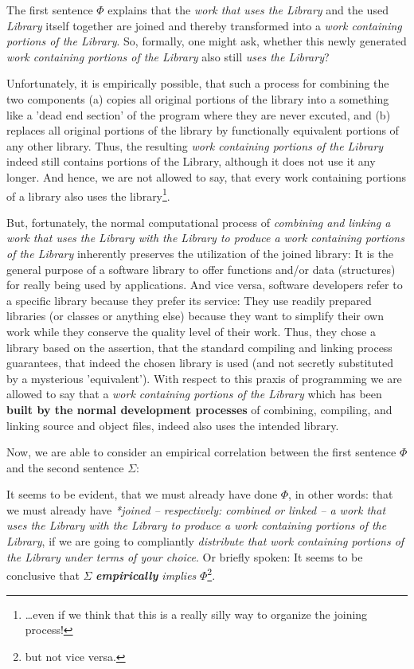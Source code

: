 The first sentence $\Phi$ explains that the \emph{work that uses the Library}
and the used \emph{Library} itself together are joined and thereby transformed
into a \emph{work containing portions of the Library}. So, formally, one might
ask, whether this newly generated \emph{work containing portions of the Library}
also still \emph{uses the Library}?

Unfortunately, it is empirically possible, that such a process for combining the
two components (a) copies all original portions of the library into a something
like a 'dead end section' of the program where they are never excuted, and (b)
replaces all original portions of the library by functionally equivalent
portions of any other library. Thus, the resulting \emph{work containing
portions of the Library} indeed still contains portions of the Library, although
it does not use it any longer. And hence, we are not allowed to say, that every
work containing portions of a library also uses the library\footnote{\ldots even
if we think that this is a really silly way to organize the joining process!}.

But, fortunately, the normal computational process of \emph{combining and
linking a work that uses the Library with the Library to produce a work
containing portions of the Library} inherently preserves the utilization of the
joined library: It is the general purpose of a software library to offer
functions and/or data (structures) for really being used by applications. And
vice versa, software developers refer to a specific library because they prefer
its service: They use readily prepared libraries (or classes or anything else)
because they want to simplify their own work while they conserve the quality
level of their work. Thus, they chose a library based on the assertion, that the
standard compiling and linking process guarantees, that indeed the chosen
library is used (and not secretly substituted by a mysterious 'equivalent').
With respect to this praxis of programming we are allowed to say that a
\emph{work containing portions of the Library} which has been \textbf{built by
the normal development processes} of combining, compiling, and linking source
and object files, indeed also uses the intended library.

Now, we are able to consider an empirical correlation between the first sentence
$\Phi$ and the second sentence $\Sigma$:

It seems to be evident, that we must already have done $\Phi$, in other words:
that we must already have \emph{*joined -- respectively: combined or linked -- a
work that uses the Library with the Library to produce a work containing
portions of the Library}, if we are going to compliantly \emph{distribute that
work containing portions of the Library under terms of your choice}. Or briefly
spoken: It seems to be conclusive that $\Sigma$ \emph{\textbf{empirically}
implies} $\Phi$\footnote{but not vice versa.}.

